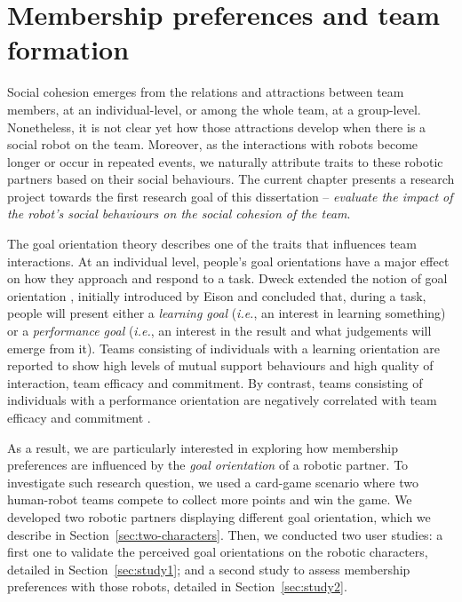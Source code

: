 \chapter{Membership preferences and team formation}
\label{chapter:membership-formation}

Social cohesion emerges from the relations and attractions between team members, at an individual-level, or among the whole team, at a group-level. Nonetheless, it is not clear yet how those attractions develop when there is a social robot on the team. Moreover, as the interactions with robots become longer or occur in repeated events, we naturally attribute traits to these robotic partners based on their social behaviours. The current chapter presents a research project towards the first research goal of this dissertation -- \textit{evaluate the impact of the robot’s social behaviours on the social cohesion of the team}.

The goal orientation theory describes one of the traits that influences team interactions. At an individual level, people's goal orientations have a major effect on how they approach and respond to a task. Dweck extended the notion of goal orientation \cite{dweck1986motivational}, initially introduced by Eison \cite{eison1979development} and concluded that, during a task, people will present either a \emph{learning goal} (\emph{i.e.}, an interest in learning something) or a \emph{performance goal} (\emph{i.e.}, an interest in the result and what judgements will emerge from it). Teams consisting of individuals with a learning orientation are reported to show high levels of mutual support behaviours and high quality of interaction, team efficacy and commitment. By contrast, teams consisting of individuals with a performance orientation are negatively correlated with team efficacy and commitment \cite{porter2005goal}.

As a result, we are particularly interested in exploring how membership preferences are influenced by the \emph{goal orientation} of a robotic partner. To investigate such research question, we used a card-game scenario where two human-robot teams compete to collect more points and win the game. We developed two robotic partners displaying different goal orientation, which we describe in Section~\ref{sec:two-characters}. Then, we conducted two user studies: a first one to validate the perceived goal orientations on the robotic characters, detailed in Section~\ref{sec:study1}; and a second study to assess membership preferences with those robots, detailed in Section~\ref{sec:study2}.




